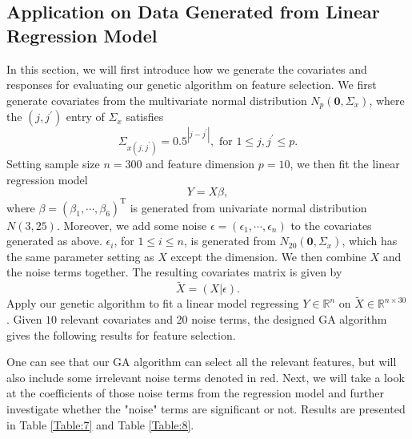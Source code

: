 \documentclass{article}
\begin{document}
\subsection{Application on Data Generated from Linear Regression Model}
In this section, we will first introduce how we generate the covariates and responses for evaluating our genetic algorithm on feature selection. We first generate covariates from the multivariate normal distribution $N_{p}(\bm{0}, \Sigma_{x})$, where the $(j, j^{\prime})$ entry of $\Sigma_{x}$ satisfies
$$
\Sigma_{x(j,j^{\prime})} = 0.5^{|j-j^{\prime}|}, \mbox{ for } 1\leq j, j^{\prime}\leq p.
$$
Setting sample size $n=300$ and feature dimension $p=10$, we then fit the linear regression model
$$
Y = X\beta,
$$
where $\beta=(\beta_{1}, \cdots, \beta_{6})^{\mathrm{T}}$ is generated from univariate normal distribution $N(3, 25)$. Moreover, we add some noise $\epsilon=(\epsilon_{1}, \cdots, \epsilon_{n})$ to the covariates generated as above. $\epsilon_{i}$, for $1\leq i \leq n$, is generated from $N_{20}(\bm{0}, \Sigma_{x})$, which has the same parameter setting as $X$ except the dimension. We then combine $X$ and the noise terms together. The resulting covariates matrix is given by
$$
\tilde{X} = (X|\epsilon).
$$
Apply our genetic algorithm to fit a linear model regressing $Y\in \mathbb{R}^{n}$ on $\tilde{X}\in \mathbb{R}^{n\times 30}$. Given $10$ relevant covariates and 20 noise terms, the designed GA algorithm gives the following results for feature selection.
\begin{table}[ht]
\centering
{}
\end{table}

One can see that our GA algorithm can select all the relevant features, but will also include some irrelevant noise terms denoted in red. Next, we will take a look at the coefficients of those noise terms from the regression model and further investigate whether the "noise" terms are significant or not. Results are presented in Table \ref{Table:7} and Table \ref{Table:8}.
\end{document}
